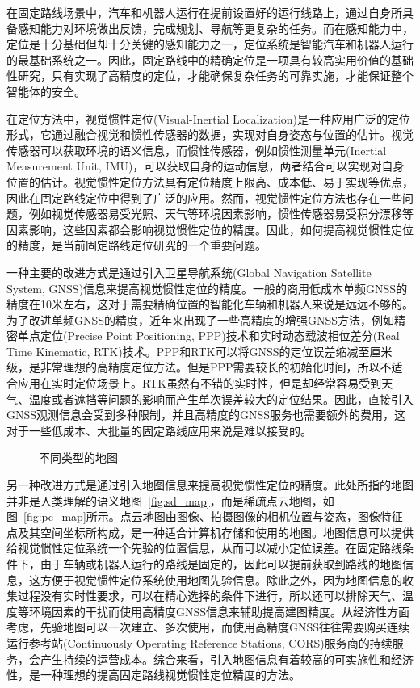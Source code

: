 在固定路线场景中，汽车和机器人运行在提前设置好的运行线路上，通过自身所具备感知能力对环境做出反馈，完成规划、导航等更复杂的任务。而在感知能力中，定位是十分基础但却十分关键的感知能力之一，定位系统是智能汽车和机器人运行的最基础系统之一。因此，固定路线中的精确定位是一项具有较高实用价值的基础性研究，只有实现了高精度的定位，才能确保复杂任务的可靠实施，才能保证整个智能体的安全。

在定位方法中，视觉惯性定位(Visual-Inertial Localization)是一种应用广泛的定位形式，它通过融合视觉和惯性传感器的数据，实现对自身姿态与位置的估计。视觉传感器可以获取环境的语义信息，而惯性传感器，例如惯性测量单元(Inertial Measurement Unit, IMU)，可以获取自身的运动信息，两者结合可以实现对自身位置的估计。视觉惯性定位方法具有定位精度上限高、成本低、易于实现等优点，因此在固定路线定位中得到了广泛的应用。然而，视觉惯性定位方法也存在一些问题，例如视觉传感器易受光照、天气等环境因素影响，惯性传感器易受积分漂移等因素影响，这些因素都会影响视觉惯性定位的精度。因此，如何提高视觉惯性定位的精度，是当前固定路线定位研究的一个重要问题。

一种主要的改进方式是通过引入卫星导航系统(Global Navigation Satellite System, GNSS)信息来提高视觉惯性定位的精度。一般的商用低成本单频GNSS的精度在10米左右，这对于需要精确位置的智能化车辆和机器人来说是远远不够的。为了改进单频GNSS的精度，近年来出现了一些高精度的增强GNSS方法，例如精密单点定位(Precise Point Positioning, PPP)\cite{zumberge1997precise}技术和实时动态载波相位差分(Real Time Kinematic, RTK)\cite{fotopoulos2001overview}技术。PPP和RTK可以将GNSS的定位误差缩减至厘米级，是非常理想的高精度定位方法。但是PPP需要较长的初始化时间\cite{bisnath2018innovation}，所以不适合应用在实时定位场景上。RTK虽然有不错的实时性，但是却经常容易受到天气、温度或者遮挡等问题的影响而产生单次误差较大的定位结果\cite{li2022review}。因此，直接引入GNSS观测信息会受到多种限制，并且高精度的GNSS服务也需要额外的费用，这对于一些低成本、大批量的固定路线应用来说是难以接受的。

\begin{figure}
  \centering
  \caption{不同类型的地图}
  \label{fig:maps}
\end{figure}

另一种改进方式是通过引入地图信息来提高视觉惯性定位的精度。此处所指的地图并非是人类理解的语义地图~\ref{fig:sd_map}，而是稀疏点云地图，如图~\ref{fig:pc_map}所示。点云地图由图像、拍摄图像的相机位置与姿态，图像特征点及其空间坐标所构成，是一种适合计算机存储和使用的地图。地图信息可以提供给视觉惯性定位系统一个先验的位置信息，从而可以减小定位误差。在固定路线条件下，由于车辆或机器人运行的路线是固定的，因此可以提前获取到路线的地图信息，这方便于视觉惯性定位系统使用地图先验信息。除此之外，因为地图信息的收集过程没有实时性要求，可以在精心选择的条件下进行，所以还可以排除天气、温度等环境因素的干扰而使用高精度GNSS信息来辅助提高建图精度。从经济性方面考虑，先验地图可以一次建立、多次使用，而使用高精度GNSS往往需要购买连续运行参考站(Continuously Operating Reference Stations, CORS)服务商的持续服务\cite{CSKC202501011}，会产生持续的运营成本。综合来看，引入地图信息有着较高的可实施性和经济性，是一种理想的提高固定路线视觉惯性定位精度的方法。

